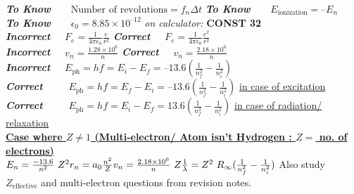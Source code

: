 \documentclass[a4paper,12pt]{article}
\newcommand{\sz}{\text{--}}
\newcommand{\mathhl}[2]{\colorbox{#1}{$#2$}}
\newcommand{\tpowten}[1]{{\scriptstyle \times} 10^{#1}}
\newcommand{\tnpowten}[1]{{\scriptstyle \times} 10^{\sz#1}}
\begin{document}
{
    \fontsize{14}{18}\selectfont
    \noindent
    \textbf{\textit{To Know}~~~} \mathhl{yelhl}{\text{Number of revolutions} = f_n\Delta t} \qquad \textbf{\textit{To Know}~~~} \mathhl{yelhl}{E_\text{ionization} = \sz E_n} \\[+2mm]
    \textbf{\textit{To Know}~~~} \mathhl{yelhl}{\epsilon_0 = 8.85 \tnpowten{12}} \qquad \textit{on calculator: } \textbf{CONST 32}\\[+2mm]
    \textbf{\textit{Incorrect}~~} \mathhl{redhl}{F_e=\frac{1}{4\pi\epsilon_0}\frac{e}{r^2}} \qquad \qquad \textbf{\textit{Correct}~~} \mathhl{greenhl}{F_e=\frac{1}{4\pi\epsilon_0}\frac{e^2}{r^2}}\\[+1em]
    \textbf{\textit{Incorrect}~~} \mathhl{redhl}{v_n = \frac{1.28\tpowten{6}}{n}} \qquad \qquad \textbf{\textit{Correct}~~} \mathhl{greenhl}{v_n = \frac{2.18\tpowten{6}}{n}}\\[+1em]
    \textbf{\textit{Incorrect}~~} \mathhl{redhl}{E_\text{ph} = hf = E_i - E_f = \sz 13.6 (\frac{1}{n_f^2} - \frac{1}{n_i^2})}\\
    \textbf{\textit{Correct}~~~~} \mathhl{greenhl}{E_\text{ph} = hf = E_f - E_i = \sz 13.6 (\frac{1}{n_f^2} - \frac{1}{n_i^2})} \quad \ul{in case of excitation}\\
    \textbf{\textit{Correct}~~~~} \mathhl{greenhl}{E_\text{ph} = hf = E_i - E_f = 13.6 (\frac{1}{n_f^2} - \frac{1}{n_i^2})} \quad \ul{in case of radiation/ relaxation}\\[+2em]
    \textbf{\underline{Case where $Z \ne 1$ (Multi-electron/ Atom isn't Hydrogen : $Z =$ no. of electrons)}}\\[+1em]
    $
        E_n = \frac{-13.6}{n^2}~Z^2\\[+2mm]
        r_n = a_0 \frac{n^2}{Z}\\[+2mm]
        v_n = \frac{2.18\tpowten{6}}{n}~Z\\[+2mm]
        \frac{1}{\lambda} = Z^2~R_\infty(\frac{1}{n_f^2}-\frac{1}{n_i^2})\\[+2em]
    $
    Also study $Z_{\text{effective}}$ and multi-electron questions from revision notes.

}

\newpage
\end{document}
